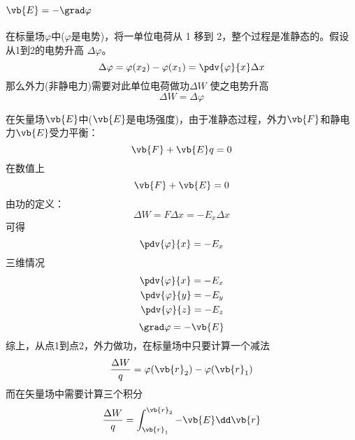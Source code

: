
\section{ \( \vb{E} = - \grad \varphi \) }%

在标量场\( \varphi \)中(\( \varphi \)是电势)，将一单位电荷从 1 移到 2，整个过程是准静态的。假设从1到2的电势升高 \( \Delta \varphi \)。
\begin{equation*}
	\Delta \varphi = \varphi(x_2) - \varphi(x_1) 
	= 
	\pdv{\varphi}{x} \Delta x
\end{equation*}
那么外力(非静电力)需要对此单位电荷做功\( \Delta W \) 使之电势升高
\begin{equation*}
	\Delta W = \Delta \varphi
\end{equation*}

在矢量场\( \vb{E} \)中(\( \vb{E} \)是电场强度)，由于准静态过程，外力\( \vb{F} \)和静电力\( \vb{E} \)受力平衡：
\begin{equation*}
	\vb{F} + \vb{E}q = 0
\end{equation*}
在数值上
\begin{equation*}
	\vb{F} + \vb{E} = 0
\end{equation*}
由功的定义：
\begin{equation*}
	\Delta W = F \Delta x = -E_x \Delta x
\end{equation*}
可得
\begin{equation*}
	\pdv{\varphi}{x} = - E_x
\end{equation*}
三维情况
\begin{align*}
	\pdv{\varphi}{x} = - E_x \\
	\pdv{\varphi}{y} = - E_y \\
	\pdv{\varphi}{z} = - E_z
\end{align*}
\begin{equation}
	\grad \varphi = -\vb{E}
\end{equation}
综上，从点1到点2，外力做功，在标量场中只要计算一个减法
\begin{equation*}
 \frac{\Delta W}{q}	 = \varphi(\vb{r}_2) - \varphi(\vb{r}_1)
\end{equation*}
而在矢量场中需要计算三个积分
\begin{equation*}
	\frac{\Delta W}{q}	 =\int_{\vb{r}_1}^{\vb{r}_2} - \vb{E} \dd \vb{r}
\end{equation*}

